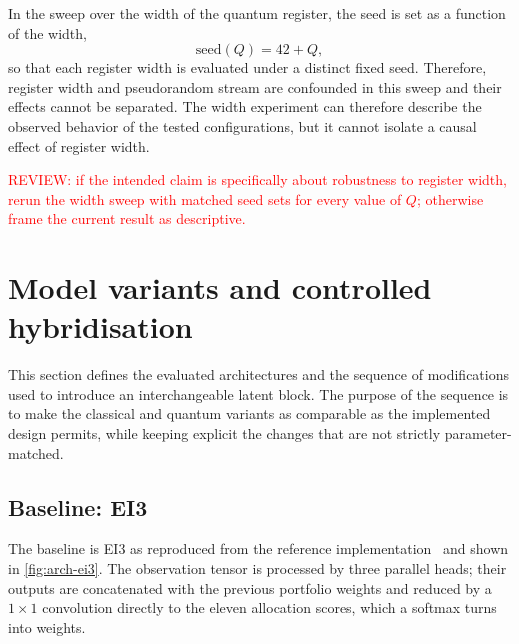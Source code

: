 \documentclass[aps,floatfix,superscriptaddress,twocolumn,tightenlines,amsmath,amssymb,nofootinbib,10pt,longbibliography,prl]{revtex4-2}
\begin{document}
In the sweep over the width of the quantum register, the seed is set as a function of the
width,
%
\begin{equation}
  \mathrm{seed}(Q) = 42 + Q,
  \label{eq:seed-rule}
\end{equation}
%
so that each register width is evaluated under a distinct fixed seed. Therefore, register
width and pseudorandom stream are confounded in this sweep and their effects cannot be
separated. The width experiment can therefore describe the observed behavior of the tested
configurations, but it cannot isolate a causal effect of register width.

\textcolor{red}{REVIEW: if the intended claim is specifically about robustness
to register width, rerun the width sweep with matched seed sets for every value of $Q$;
otherwise frame the current result as descriptive.}

\section{Model variants and controlled hybridisation}
\label{sec:architectures}

This section defines the evaluated architectures and the sequence of modifications used to
introduce an interchangeable latent block. The purpose of the sequence is to make the
classical and quantum variants as comparable as the implemented design permits, while
keeping explicit the changes that are not strictly parameter-matched.

\subsection{Baseline: EI3}
\label{subsec:arch-ei3}

The baseline is EI3 as reproduced from the reference implementation~\cite{RLportfolio} and
shown in \ref{fig:arch-ei3}. The observation tensor is processed by three parallel heads;
their outputs are concatenated with the previous portfolio weights and reduced by a
$1\times1$ convolution directly to the eleven allocation scores, which a softmax turns into
weights.
\end{document}
